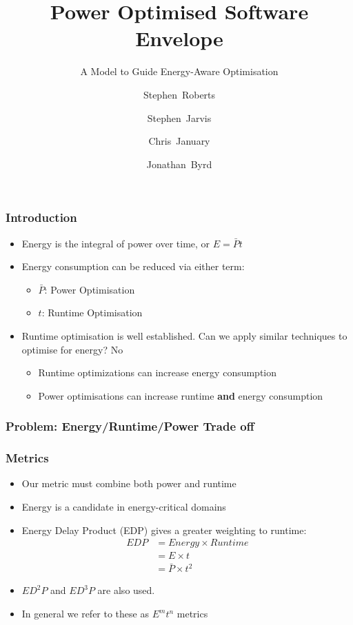 \documentclass{beamer}
\title[POSE] %
{Power Optimised Software Envelope}
\subtitle{A Model to Guide Energy-Aware Optimisation}
\author[Roberts et al.] %
{Stephen~Roberts\inst{1} \and Stephen~Jarvis\inst{1} \\
 \and Chris~January\inst{1} \and Jonathan~Byrd\inst{2}}
\institute[University of Warwick] %
{
    \inst{1}%
      Department of Computer Science\\
      The University of Warwick
    \and
      \inst{2}%
        Allinea Software
}
\begin{document}
  \frame{\titlepage}


  \begin{frame}
    \frametitle{Introduction}
    \begin{itemize}
      \item Energy is the integral of power over time, or $E = \bar{P}t$
      \item Energy consumption can be reduced via either term:
      \begin{itemize}
        \item $\bar{P}$: Power Optimisation
        \item $t$: Runtime Optimisation
      \end{itemize}
      \item Runtime optimisation is well established. Can we apply similar techniques to optimise for energy? No
       \begin{itemize}
        \item Runtime optimizations can increase energy consumption
        \item Power optimisations can increase runtime \textbf{and} energy consumption
      \end{itemize}
    \end{itemize}
  \end{frame}
  
  \begin{frame}
    \frametitle{Problem: Energy/Runtime/Power Trade off}
    \begin{figure}
    \centering
    
    \end{figure}
  \end{frame}

  \begin{frame}
  \frametitle{Metrics}
  \begin{itemize}
  \item Our metric must combine both power and runtime
  \item Energy is a candidate in energy-critical domains
  \item Energy Delay Product (EDP) gives a greater weighting to runtime:
  \begin{align}
    EDP &= Energy \times Runtime \nonumber \\
        &= E \times t \nonumber \\
        &= \bar{P} \times t^2
  \end{align}
  \item $ED^2P$ and $ED^3P$ are also used.
  \item In general we refer to these as $E^mt^n$ metrics 
  \end{itemize}
  \end{frame}
\end{document}
